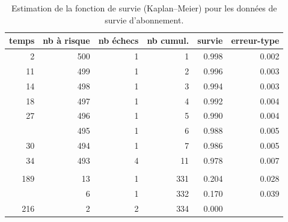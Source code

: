 \documentclass[
  11pt,
  letterpaper,
]{scrbook}
\newenvironment{Shaded}{\begin{snugshade}}{\end{snugshade}}
\newcommand{\AttributeTok}[1]{\textcolor[rgb]{0.40,0.45,0.13}{#1}}
\newcommand{\CommentTok}[1]{\textcolor[rgb]{0.37,0.37,0.37}{#1}}
\newcommand{\DecValTok}[1]{\textcolor[rgb]{0.68,0.00,0.00}{#1}}
\newcommand{\FunctionTok}[1]{\textcolor[rgb]{0.28,0.35,0.67}{#1}}
\newcommand{\NormalTok}[1]{\textcolor[rgb]{0.00,0.23,0.31}{#1}}
\newcommand{\OtherTok}[1]{\textcolor[rgb]{0.00,0.23,0.31}{#1}}
\newcommand{\SpecialCharTok}[1]{\textcolor[rgb]{0.37,0.37,0.37}{#1}}
\newcommand{\StringTok}[1]{\textcolor[rgb]{0.13,0.47,0.30}{#1}}
\theoremstyle{definition}
\theoremstyle{remark}
\begin{document}
\hypertarget{tbl-survie1-tableau}{}
\begin{table}
\caption{\label{tbl-survie1-tableau}Estimation de la fonction de survie (Kaplan--Meier) pour les données de
survie d'abonnement. }\tabularnewline

\centering
\begin{tabular}{rrrrrr}
\toprule
temps & nb à risque & nb échecs & nb cumul. & survie & erreur-type\\
\midrule
2 & 500 & 1 & 1 & 0.998 & 0.002\\
11 & 499 & 1 & 2 & 0.996 & 0.003\\
14 & 498 & 1 & 3 & 0.994 & 0.003\\
18 & 497 & 1 & 4 & 0.992 & 0.004\\
27 & 496 & 1 & 5 & 0.990 & 0.004\\
\addlinespace
29 & 495 & 1 & 6 & 0.988 & 0.005\\
30 & 494 & 1 & 7 & 0.986 & 0.005\\
34 & 493 & 4 & 11 & 0.978 & 0.007\\
 &  &  &  &  & \\
189 & 13 & 1 & 331 & 0.204 & 0.028\\
\addlinespace
202 & 6 & 1 & 332 & 0.170 & 0.039\\
216 & 2 & 2 & 334 & 0.000 & \\
\bottomrule
\end{tabular}
\end{table}

\begin{Shaded}
\end{Shaded}
\end{document}
